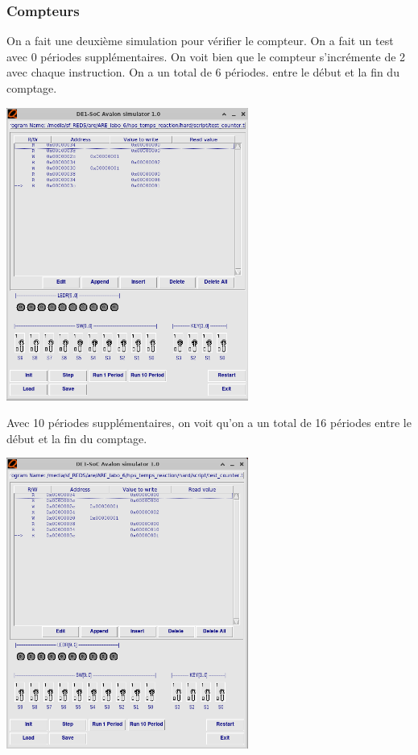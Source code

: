 \documentclass[a4paper,12pt]{article}
\begin{document}
\break

\subsubsection{Compteurs}

On a fait une deuxième simulation pour vérifier le compteur. On a fait un test avec 0 périodes supplémentaires. On voit bien que le compteur s'incrémente de 2 avec chaque instruction. On a un total de 6 périodes. entre le début et la fin du comptage.

\begin{center}
    \includegraphics[width=300px]{test_cmpt_0_periods.png}
\end{center}

Avec 10 périodes supplémentaires, on voit qu'on a un total de 16 périodes entre le début et la fin du comptage.

\begin{center}
    \includegraphics[width=300px]{test_cmpt_10_periods.png}
\end{center}
\end{document}
